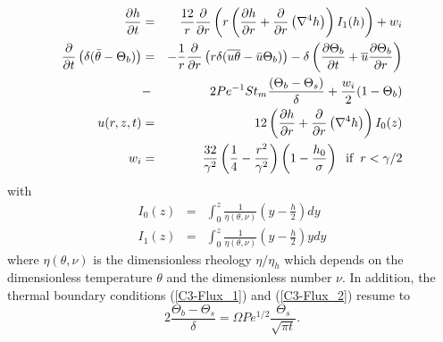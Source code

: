   \begin{eqnarray}
    \frac{\partial h}{\partial t}& =& \frac{12}{r}
                                      \frac{\partial}{\partial r} \left( r\left( \frac{\partial h}{\partial      r}+\frac{\partial}{\partial      r}\left(\nabla^4h\right)\right)I_1(h)\right)
                                      + w_i\label{EqFinal1}\\
    \frac{\partial}{\partial
    t}\left( \delta( \bar{\theta}-\Theta_b)\right)&=&-\frac{1}{r}\frac{\partial}{\partial
                                                      r}  \left(   r\delta(\overline{u\theta}-\bar{u}\Theta_b)\right)  -
                                                      \delta\left(      \frac{\partial       \Theta_b}{\partial      t}+
                                                      \overline{u}\frac{\partial     \Theta_b}{\partial    r}\right)\nonumber\\
                                 &-&
                                     2Pe^{-1}St_m\frac{\left(\Theta_b-\Theta_s\right)}{\delta}+\frac{w_{i}}{2}(1-\Theta_b)\label{HeatDimensionLess}\\
    u(r,z,t)&   =&   12\left(   \frac{\partial   h}{\partial
                   r}+\frac{\partial}{\partial
                   r}\left(\nabla^4h\right)\right)I_0(z)\label{C3-Veloc}\\
    w_{i}&=&
             \frac{32}{\gamma^{2}}\left(\frac{1}{4}-\frac{r^{2}}{\gamma^{2}}\right)\left(1-\frac{h_0}{\sigma}\right)\hspace{.2cm}
             \text{if} \hspace{.2cm} r < \gamma/2 \\
\end{eqnarray}
with 
\begin{eqnarray}
  I_0(z)&=&\int_0^z\frac{1}{\eta(\theta,\nu)}\left(y-\frac{h}{2}\right)
    dy \\
I_1(z) &=& \int_0^z\frac{1}{\eta(\theta,\nu)}\left(y-\frac{h}{2}\right)y dy
  \end{eqnarray}
  where $\eta(\theta,\nu)$ is the dimensionless rheology $\eta/\eta_h$
  which  depends on  the  dimensionless temperature  $\theta$ and  the
  dimensionless  number  $\nu$.   In addition,  the  thermal  boundary
  conditions (\ref{C3-Flux_1}) and (\ref{C3-Flux_2}) resume to
  \begin{equation}
    2\frac{\Theta_b-\Theta_s}{\delta}               =               \Omega
    Pe^{1/2}\frac{\Theta_s}{\sqrt{\pi t}}.
    \label{C3-Boundary-Condi}
  \end{equation}
